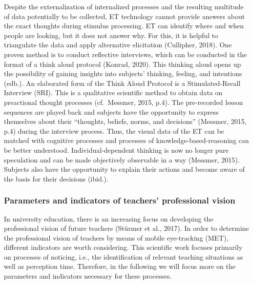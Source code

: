 \documentclass[
  man]{apa6}
\begin{document}
Despite the externalization of internalized processes and the resulting multitude of data potentially to be collected, ET technology cannot provide answers about the exact thoughts during stimulus processing. ET can identify where and when people are looking, but it does not answer why. For this, it is helpful to triangulate the data and apply alternative elicitation (Cullipher, 2018). One proven method is to conduct reflective interviews, which can be conducted in the format of a think aloud protocol (Konrad, 2020). This thinking aloud opens up the possibility of gaining insights into subjects' thinking, feeling, and intentions (edb.). An elaborated form of the Think Aloud Protocol is a Stimulated-Recall Interview (SRI). This is a qualitative scientific method to obtain data on preactional thought processes (cf.~Messmer, 2015, p.4). The pre-recorded lesson sequences are played back and subjects have the opportunity to express themselves about their ``thoughts, beliefs, norms, and decisions'' (Messmer, 2015, p.4) during the interview process. Thus, the visual data of the ET can be matched with cognitive processes and processes of knowledge-based-reasoning can be better understood. Individual-dependent thinking is now no longer pure speculation and can be made objectively observable in a way (Messmer, 2015). Subjects also have the opportunity to explain their actions and become aware of the basis for their decisions (ibid.).

\hypertarget{parameters-and-indicators-of-teachers-professional-vision}{%
\subsubsection{Parameters and indicators of teachers' professional vision}\label{parameters-and-indicators-of-teachers-professional-vision}}

In university education, there is an increasing focus on developing the professional vision of future teachers (Stürmer et al., 2017). In order to determine the professional vision of teachers by means of mobile eye-tracking (MET), different indicators are worth considering. This scientific work focuses primarily on processes of noticing, i.e., the identification of relevant teaching situations as well as perception time. Therefore, in the following we will focus more on the parameters and indicators necessary for these processes.
\end{document}
